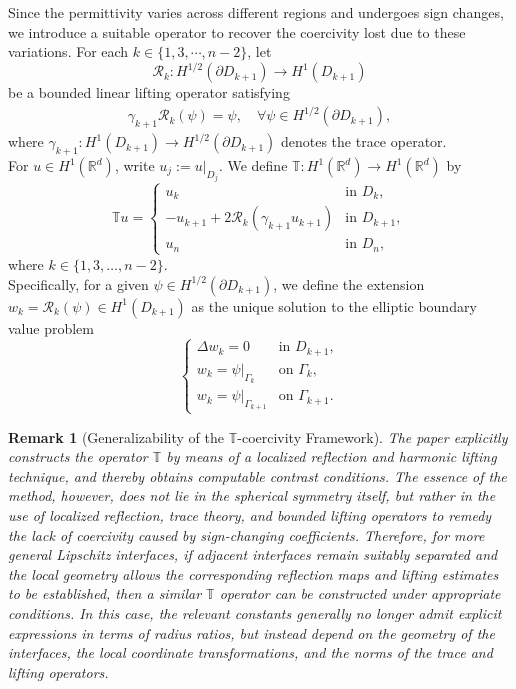 \documentclass[12pt,reqno]{amsart}
\newtheorem{remark}[theorem]{Remark}
\numberwithin{equation}{section}
\begin{document}
Since the permittivity varies across different regions and undergoes sign changes, we introduce a suitable operator to recover the coercivity lost due to these variations. For each \(k\in\{1,3,\cdots,n-2\}\), let
\[
\mathcal R_k:
H^{1/2}(\partial D_{k+1})
\longrightarrow H^1(D_{k+1})
\]
be a bounded linear lifting operator satisfying
\begin{align*}
\gamma_{k+1}\mathcal R_k(\psi)=\psi,\quad\forall\psi\in H^{1/2}(\partial D_{k+1}),
\end{align*}
where \(\gamma_{k+1}:H^1(D_{k+1})\to H^{1/2}(\partial D_{k+1})\) denotes the trace operator.\\
For \(u\in H^1(\mathbb R^d)\), write \(u_j:=u|_{D_j}\). We define $\mathbb{T}: H^1(\mathbb{R}^d) \to H^1(\mathbb{R}^d)$ by
\begin{equation}\label{eq:coercive-operator}
\mathbb{T}u =
\begin{cases}
u_k & \text{in } D_k,\\[4pt]
-u_{k+1} + 2\mathcal{R}_k(\gamma_{k+1}u_{k+1}) & \text{in } D_{k+1},\\[4pt]
u_n & \text{in } D_n,
\end{cases}
\end{equation}
where $k \in \{1, 3, \ldots, n-2\}$.\\
Specifically, for a given $\psi \in H^{1/2}(\partial D_{k+1})$, we define the extension $w_k = \mathcal{R}_k(\psi) \in H^1(D_{k+1})$ as the unique solution to the elliptic boundary value problem
\begin{equation}\label{eq:harmonic-extension}
\begin{cases}
\Delta w_k = 0 & \text{in } D_{k+1},\\[4pt]
w_k =\psi|_{\Gamma_k} & \text{on } \Gamma_k,\\[4pt]
w_k =\psi|_{\Gamma_{k+1}} & \text{on } \Gamma_{k+1}.
\end{cases}
\end{equation}




\begin{remark}[Generalizability of the $\mathbb T$-coercivity Framework]
The paper explicitly constructs the operator $\mathbb{T}$ by means of a localized reflection and harmonic lifting technique, and thereby obtains computable contrast conditions. The essence of the method, however, does not lie in the spherical symmetry itself, but rather in the use of localized reflection, trace theory, and bounded lifting operators to remedy the lack of coercivity caused by sign-changing coefficients. Therefore, for more general Lipschitz interfaces, if adjacent interfaces remain suitably separated and the local geometry allows the corresponding reflection maps and lifting estimates to be established, then a similar $\mathbb{T}$ operator can be constructed under appropriate conditions. In this case, the relevant constants generally no longer admit explicit expressions in terms of radius ratios, but instead depend on the geometry of the interfaces, the local coordinate transformations, and the norms of the trace and lifting operators.
\end{remark}
\end{document}
